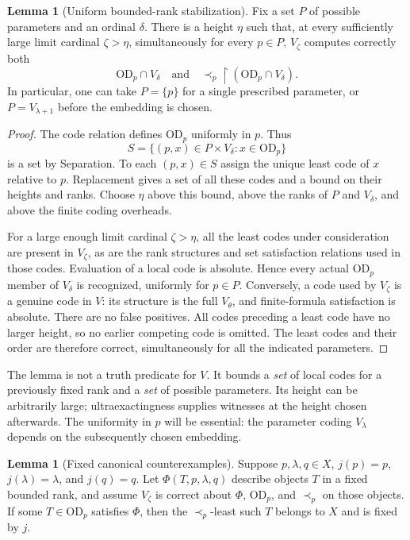 \documentclass[11pt,letterpaper]{article}
\theoremstyle{definition}
\newtheorem{lemma}[definition]{Lemma}
\newcommand{\OD}{\mathrm{OD}}
\newcommand{\restr}{\mathbin{\upharpoonright}}
\numberwithin{equation}{section}
\begin{document}
\begin{lemma}[Uniform bounded-rank stabilization]\label{lem:stabilization}
Fix a set $P$ of possible parameters and an ordinal $\delta$. There is a
height $\eta$ such that, at every sufficiently large limit cardinal
$\zeta>\eta$, simultaneously for every $p\in P$, $V_\zeta$ computes correctly
both
\[
             \OD_p\cap V_\delta
 \quad\text{and}\quad
             \prec_p\restr(\OD_p\cap V_\delta).
\]
In particular, one can take $P=\{p\}$ for a single prescribed parameter, or
$P=V_{\lambda+1}$ before the embedding is chosen.
\end{lemma}

\begin{proof}
The code relation defines $\OD_p$ uniformly in $p$. Thus
\[
             S=\{(p,x)\in P\times V_\delta:x\in\OD_p\}
\]
is a set by Separation. To each $(p,x)\in S$ assign the unique least code
of $x$ relative to $p$. Replacement gives a set of all these codes and a
bound on their heights and ranks. Choose $\eta$ above this bound, above the
ranks of $P$ and $V_\delta$, and above the finite coding overheads.

For a large enough limit cardinal $\zeta>\eta$, all the least codes under
consideration are present in $V_\zeta$, as are the rank structures and set
satisfaction relations used in those codes. Evaluation of a local code is
absolute. Hence every actual $\OD_p$ member of $V_\delta$ is recognized,
uniformly for $p\in P$. Conversely, a code used by $V_\zeta$ is a genuine
code in $V$: its structure is the full $V_\theta$, and finite-formula
satisfaction is absolute. There are no false positives. All codes preceding
a least code have no larger height, so no earlier competing code is omitted.
The least codes and their order are therefore correct, simultaneously for
all the indicated parameters.
\end{proof}

The lemma is not a truth predicate for $V$. It bounds a \emph{set} of local
codes for a previously fixed rank and a \emph{set} of possible parameters.
Its height can be arbitrarily large; ultraexactingness supplies witnesses
at the height chosen afterwards. The uniformity in $p$ will be essential:
the parameter coding $V_\lambda$ depends on the subsequently chosen embedding.

\begin{lemma}[Fixed canonical counterexamples]\label{lem:canonical}
Suppose $p,\lambda,q\in X$, $j(p)=p$, $j(\lambda)=\lambda$, and $j(q)=q$.
Let $\Phi(T,p,\lambda,q)$ describe objects $T$ in a fixed bounded rank, and
assume $V_\zeta$ is correct about $\Phi$, $\OD_p$, and $\prec_p$ on those
objects. If some $T\in\OD_p$ satisfies $\Phi$, then the $\prec_p$-least such
$T$ belongs to $X$ and is fixed by $j$.
\end{lemma}
\end{document}
